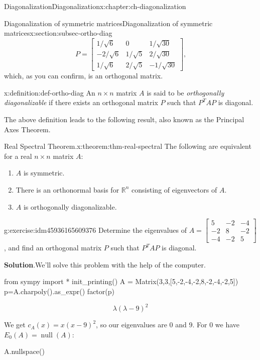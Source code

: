 \documentclass[oneside,10pt,]{book}
\newcommand{\blocktitlefont}{\relax}
\numberwithin{equation}{section}
\newcommand{\bbm}{\begin{bmatrix}}
\newcommand{\ebm}{\end{bmatrix}}
\newcommand{\R}{\mathbb{R}}
\newcommand{\nll}{\operatorname{null}}
\newcommand{\amp}{&}
\begin{document}
\begin{chapterptx}{Diagonalization}{}{Diagonalization}{}{}{x:chapter:ch-diagonalization}
\begin{sectionptx}{Diagonalization of symmetric matrices}{}{Diagonalization of symmetric matrices}{}{}{x:section:subsec-ortho-diag}
\begin{equation*}
P = \bbm 1/\sqrt{6}\amp 0 \amp 1/\sqrt{30}\\-2/\sqrt{6}\amp 1/\sqrt{5}\amp 2/\sqrt{30}\\1/\sqrt{6}\amp 2/\sqrt{5}\amp -1/\sqrt{30}\ebm\text{,}
\end{equation*}
which, as you can confirm, is an orthogonal matrix.%
\begin{definition}{}{x:definition:def-ortho-diag}%
An \(n\times n\) matrix \(A\) is said to be \emph{orthogonally diagonalizable} if there exists an orthogonal matrix \(P\) such that \(P^TAP\) is diagonal.%
\end{definition}
The above definition leads to the following result, also known as the Principal Axes Theorem.%
\begin{theorem}{Real Spectral Theorem.}{}{x:theorem:thm-real-spectral}%
The following are equivalent for a real \(n\times n\) matrix \(A\):%
\begin{enumerate}
\item{}\(A\) is symmetric.%
\item{}There is an orthonormal basis for \(\R^n\) consisting of eigenvectors of \(A\).%
\item{}\(A\) is orthogonally diagonalizable.%
\end{enumerate}
%
\end{theorem}
\begin{inlineexercise}{}{g:exercise:idm45936165609376}%
Determine the eigenvalues of \(A=\bbm 5\amp -2\amp -4\\-2\amp 8\amp -2\\-4\amp -2\amp 5\ebm\), and find an orthogonal matrix \(P\) such that \(P^TAP\) is diagonal.%
\par\smallskip%
\noindent\textbf{\blocktitlefont Solution}.\label{g:solution:idm45936165607456}{}\hypertarget{g:solution:idm45936165607456}{}\quad{}We'll solve this problem with the help of the computer.%
\begin{sageinput}
from sympy import *
init_printing()
A = Matrix(3,3,[5,-2,-4,-2,8,-2,-4,-2,5])
p=A.charpoly().as_expr()
factor(p)
\end{sageinput}
\begin{sageoutput}
\[\lambda(\lambda-9)^2\]
\end{sageoutput}
We get \(c_A(x)=x(x-9)^2\), so our eigenvalues are \(0\) and \(9\). For \(0\) we have \(E_0(A) = \nll(A)\):%
\begin{sageinput}
A.nullspace()
\end{sageinput}
\begin{sageoutput}

\end{sageoutput}
\end{inlineexercise}
\end{sectionptx}
\end{chapterptx}
\end{document}

